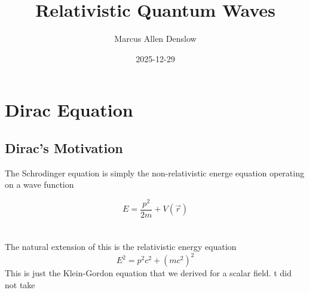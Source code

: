 \documentclass{report}
\title{\Huge{Relativistic Quantum Waves}}
\author{\Huge{Marcus Allen Denslow}}
\date{2025-12-29}
\begin{document}
\maketitle
\newpage%
\tableofcontents
\pagebreak

\chapter{Dirac Equation}
\section{Dirac's Motivation}
The Schrodinger equation is simply the non-relativistic energe equation operating on a wave function

\begin{equation}
    E = \frac{p^2}{2m} + V(\vec{r})
\end{equation}
\\
\\
The natural extension of this is the relativistic energy equation
\begin{equation}
    E^2 = p^2 c^2 + (mc^2)^2
\end{equation}
\vspace{2em}
This is just the Klein-Gordon equation that we derived for a scalar field. t did not take 
\end{document}
